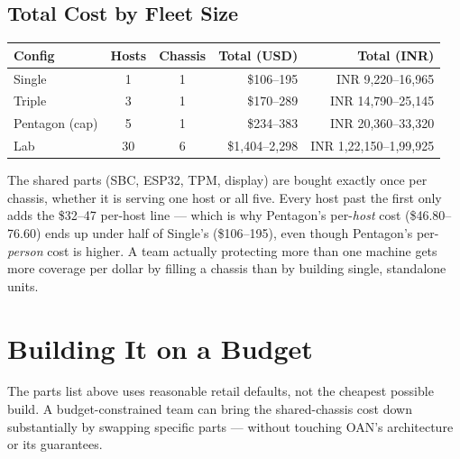 \documentclass[11pt,a4paper]{article}
\begin{document}
\subsection{Total Cost by Fleet Size}

\begin{center}
\renewcommand{\arraystretch}{1.3}
\small
\begin{tabular}{@{}lccrr@{}}
\toprule
\textbf{Config} & \textbf{Hosts} & \textbf{Chassis} & \textbf{Total (USD)} & \textbf{Total (INR)} \\
\midrule
Single & 1 & 1 & \$106--195 & INR 9,220--16,965 \\
Triple & 3 & 1 & \$170--289 & INR 14,790--25,145 \\
Pentagon (cap) & 5 & 1 & \$234--383 & INR 20,360--33,320 \\
Lab & 30 & 6 & \$1,404--2,298 & INR 1,22,150--1,99,925 \\
\bottomrule
\end{tabular}
\end{center}

\begin{plainbox}
The shared parts (SBC, ESP32, TPM, display) are bought exactly once per
chassis, whether it is serving one host or all five. Every host past the
first only adds the \$32--47 per-host line --- which is why Pentagon's
per-\emph{host} cost (\$46.80--76.60) ends up under half of Single's
(\$106--195), even though Pentagon's per-\emph{person} cost is higher.
A team actually protecting more than one machine gets more coverage per
dollar by filling a chassis than by building single, standalone units.
\end{plainbox}

\section{Building It on a Budget}
\label{sec:budget}

The parts list above uses reasonable retail defaults, not the cheapest
possible build. A budget-constrained team can bring the shared-chassis
cost down substantially by swapping specific parts --- without touching
OAN's architecture or its guarantees.
\end{document}
